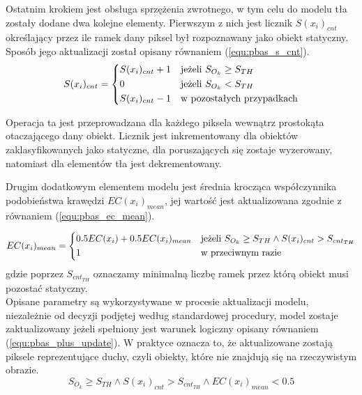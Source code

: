Ostatnim krokiem jest obsługa sprzężenia zwrotnego, w tym celu do modelu tła zostały dodane dwa kolejne elementy. 
Pierwszym z nich jest licznik $S(x_i)_{cnt}$ określający przez ile ramek dany piksel był rozpoznawany jako obiekt statyczny. 
Sposób jego aktualizacji został opisany równaniem (\ref{equ:pbas_s_cnt}). 
    \begin{equation}
	    S(x_i)_{cnt} = 
		\begin{dcases}
    		S(x_i)_{cnt} + 1 & \text{jeżeli } S_{O_k} \geq  S_{TH}	 \\
            0                & \text{jeżeli } S_{O_k} <  S_{TH}	     \\		
    		S(x_i)_{cnt} - 1 & \text{w pozostałych przypadkach} 
		\end{dcases}
	\label{equ:pbas_s_cnt}	
	\end{equation}

\noindent Operacja ta jest przeprowadzana dla każdego piksela wewnątrz prostokąta otaczającego dany obiekt. Licznik jest inkrementowany dla obiektów zaklasyfikowanych jako statyczne, dla poruszających się zostaje wyzerowany, natomiast dla elementów tła jest dekrementowany.

Drugim dodatkowym elementem modelu jest średnia krocząca współczynnika podobieństwa krawędzi $EC(x_i)_{mean}$, jej wartość jest aktualizowana zgodnie z równaniem (\ref{equ:pbas_ec_mean}).

    \begin{equation}
	    EC(x_i)_{mean} = 
		\begin{dcases}
    		0.5EC(x_i) + 0.5EC(x_i)_{mean} & \text{jeżeli } S_{O_k} \geq  S_{TH} \land S(x_i)_{cnt} > S_{{cnt}_{TH}}	 \\
            1                & \text{w przeciwnym razie}		
		\end{dcases}
	\label{equ:pbas_ec_mean}	
	\end{equation}
\noindent gdzie poprzez $S_{{cnt}_{TH}}$ oznaczamy minimalną liczbę ramek przez którą obiekt musi pozostać statyczny.
\\
\noindent Opisane parametry są wykorzystywane w procesie aktualizacji modelu, niezależnie od decyzji podjętej według standardowej procedury, model zostaje zaktualizowany jeżeli spełniony jest warunek logiczny opisany równaniem (\ref{equ:pbas_plus_update}). W praktyce oznacza to, że aktualizowane zostają piksele reprezentujące duchy, czyli obiekty, które nie znajdują się na rzeczywistym obrazie.
    \begin{equation}
	    S_{O_k} \geq S_{TH} \land S(x_i)_{cnt} > S_{cnt_{TH}} \land EC(x_i)_{mean} < 0.5
	\label{equ:pbas_plus_update}	
	\end{equation}
	
